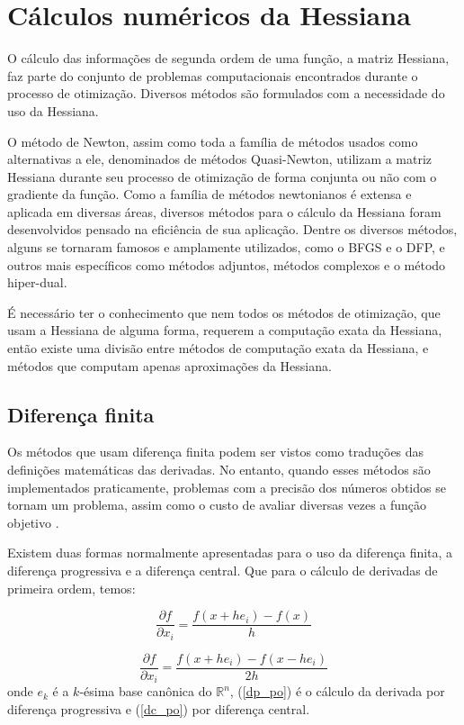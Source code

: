 \section{Cálculos numéricos da Hessiana}
O cálculo das informações de segunda ordem de uma função, a matriz Hessiana, faz parte do conjunto
de problemas computacionais encontrados durante o processo de otimização. Diversos métodos são
formulados com a necessidade do uso da Hessiana.

O método de Newton, assim como toda a família de métodos usados como alternativas a ele,
denominados de métodos Quasi-Newton, utilizam a matriz Hessiana durante seu processo de otimização
de forma conjunta ou não com o gradiente da função. Como a família de métodos newtonianos é extensa e
aplicada em diversas áreas, diversos métodos para o cálculo da Hessiana foram desenvolvidos
pensado na eficiência de sua aplicação. Dentre os diversos métodos, alguns se tornaram famosos
e amplamente utilizados, como o BFGS e o DFP, e outros mais específicos como métodos adjuntos,
métodos complexos e o método hiper-dual.

É necessário ter o conhecimento que nem todos os métodos de otimização, que usam a Hessiana de
alguma forma, requerem a computação exata da Hessiana, então existe uma divisão entre métodos
de computação exata da Hessiana, e métodos que computam apenas aproximações da Hessiana.


\subsection{Diferença finita}
Os métodos que usam diferença finita podem ser vistos como traduções das definições matemáticas
das derivadas. No entanto, quando esses métodos são implementados praticamente, problemas com a
precisão dos números obtidos se tornam um problema, assim como o custo de avaliar diversas
vezes a função objetivo \cite{caplan2011numerical}.

Existem duas formas normalmente apresentadas para o uso da diferença finita, a diferença
progressiva e a diferença central. Que para o cálculo de derivadas de primeira ordem, temos:


\begin{equation}
\label{dp_po}
\frac{\partial f}{\partial x_i} = \frac{f(x+he_i) - f(x)}{h}
\end{equation}

\begin{equation}
\label{dc_po}
\frac{\partial f}{\partial x_i} = \frac{f(x+he_i) - f(x - he_i)}{2h}
\end{equation}
onde \(e_k\) é a \(k\)-ésima base canônica do \(\mathbb{R}^n\), (\ref{dp_po}) é o cálculo
da derivada por diferença progressiva e (\ref{dc_po}) por diferença central.

